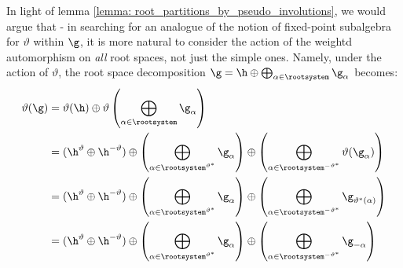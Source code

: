         In light of lemma \ref{lemma: root_partitions_by_pseudo_involutions}, we would argue that - in searching for an analogue of the notion of fixed-point subalgebra for $\vartheta$ within $\g$, it is more natural to consider the action of the weightd automorphism on \textit{all} root spaces, not just the simple ones. Namely, under the action of $\vartheta$, the root space decomposition $\g = \h \oplus \bigoplus_{\alpha \in \rootsystem} \g_{\alpha}$ becomes:
            $$
                \begin{aligned}
                    \vartheta(\g) & = \vartheta(\h) \oplus \vartheta\left( \bigoplus_{\alpha \in \rootsystem} \g_{\alpha} \right)
                    \\
                    & = (\h^{\vartheta} \oplus \h^{-\vartheta}) \oplus \left( \bigoplus_{\alpha \in \rootsystem^{\vartheta^*}} \g_{\alpha} \right) \oplus \left( \bigoplus_{\alpha \in \rootsystem^{-\vartheta^*}} \vartheta(\g_{\alpha}) \right)
                    \\
                    & = (\h^{\vartheta} \oplus \h^{-\vartheta}) \oplus \left( \bigoplus_{\alpha \in \rootsystem^{\vartheta^*}} \g_{\alpha} \right) \oplus \left( \bigoplus_{\alpha \in \rootsystem^{-\vartheta^*}} \g_{\vartheta^*(\alpha)} \right)
                    \\
                    & = (\h^{\vartheta} \oplus \h^{-\vartheta}) \oplus \left( \bigoplus_{\alpha \in \rootsystem^{\vartheta^*}} \g_{\alpha} \right) \oplus \left( \bigoplus_{\alpha \in \rootsystem^{-\vartheta^*}} \g_{-\alpha} \right)
                \end{aligned}
            $$

